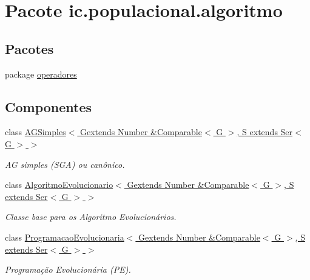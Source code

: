\hypertarget{namespaceic_1_1populacional_1_1algoritmo}{\section{Pacote ic.\-populacional.\-algoritmo}
\label{namespaceic_1_1populacional_1_1algoritmo}
}
\subsection*{Pacotes}
\begin{DoxyCompactItemize}
\item 
package \hyperlink{namespaceic_1_1populacional_1_1algoritmo_1_1operadores}{operadores}
\end{DoxyCompactItemize}
\subsection*{Componentes}
\begin{DoxyCompactItemize}
\item 
class \hyperlink{classic_1_1populacional_1_1algoritmo_1_1_a_g_simples_3_01_gextends_01_number_01_6_comparable_3_0be0ec9d5f7dd5a82100acb38215a761d}{A\-G\-Simples$<$ Gextends Number \&\-Comparable$<$ G $>$, S extends Ser$<$ G $>$ $>$}
\begin{DoxyCompactList}\small\item\em A\-G simples (S\-G\-A) ou canônico. \end{DoxyCompactList}\item 
class \hyperlink{classic_1_1populacional_1_1algoritmo_1_1_algoritmo_evolucionario_3_01_gextends_01_number_01_6_co1efdb05fe19a950b8d1e9e15f7d06254}{Algoritmo\-Evolucionario$<$ Gextends Number \&\-Comparable$<$ G $>$, S extends Ser$<$ G $>$ $>$}
\begin{DoxyCompactList}\small\item\em Classe base para os Algoritmo Evolucionários. \end{DoxyCompactList}\item 
class \hyperlink{classic_1_1populacional_1_1algoritmo_1_1_programacao_evolucionaria_3_01_gextends_01_number_01_6_8364919866d606ef485dd5624b0253b0}{Programacao\-Evolucionaria$<$ Gextends Number \&\-Comparable$<$ G $>$, S extends Ser$<$ G $>$ $>$}
\begin{DoxyCompactList}\small\item\em Programação Evolucionária (P\-E). \end{DoxyCompactList}\end{DoxyCompactItemize}
